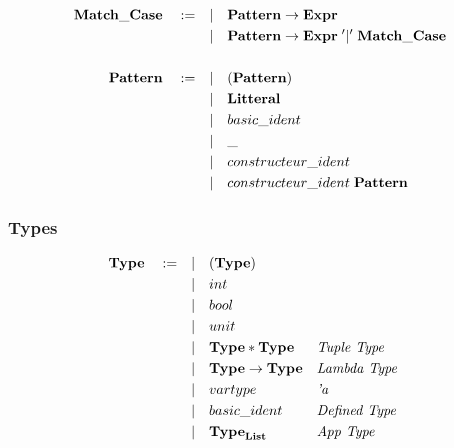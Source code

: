 \documentclass[
  12pt,
]{article}
\begin{document}
\begin{align*}
  \bf{Match\_Case}  \quad :=  \quad & |\quad  \textbf{Pattern} \rightarrow  \textbf{Expr}                         \\
                                    & |\quad \textbf{Pattern} \rightarrow  \textbf{Expr}\; '|'\; \bf{Match\_Case} \\
  \\
  \textbf{Pattern} \quad :=  \quad  & |\quad   ( \textbf{Pattern} )                                               \\
                                    & |\quad \textbf{Litteral}                                                    \\
                                    & |\quad basic\_ident                                                         \\
                                    & |\quad \_                                                                   \\
                                    & |\quad constructeur\_ident                                                  \\
                                    & |\quad constructeur\_ident \; \textbf{Pattern}                              \\
\end{align*}

\hypertarget{types-1}{%
  \subsubsection{Types}\label{types-1}}

\begin{align*}
  \textbf{Type}    \quad :=  \quad & |\quad  (\textbf{Type})                                                    \\
                                   & |\quad int                                                                 \\
                                   & |\quad bool                                                                \\
                                   & |\quad unit                                                                \\
                                   & |\quad \textbf{Type} * \textbf{Type}            &  & \textit{Tuple Type}   \\
                                   & |\quad \textbf{Type} \rightarrow  \textbf{Type} &  & \textit{Lambda Type}  \\
                                   & |\quad vartype                                  &  & \textit{'a}           \\
                                   & |\quad basic\_ident                             &  & \textit{Defined Type} \\
                                   & |\quad \textbf{Type}_{\bf{List}}                &  & \textit{App Type}     \\
\end{align*} \newpage
\end{document}
